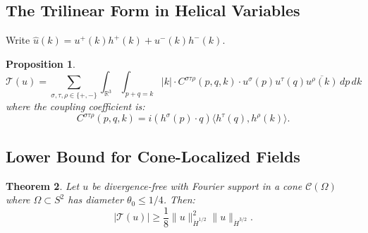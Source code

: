 \documentclass[11pt]{article}
\newtheorem{theorem}{Theorem}[section]
\newtheorem{proposition}[theorem]{Proposition}
\theoremstyle{definition}
\newcommand{\R}{\mathbb{R}}
\begin{document}
\subsection{The Trilinear Form in Helical Variables}

Write $\hat{u}(k) = u^+(k) h^+(k) + u^-(k) h^-(k)$.

\begin{proposition}\label{prop:trilinear-helical}
\begin{equation}
\mathcal{T}(u) = \sum_{\sigma, \tau, \rho \in \{+,-\}} \int_{\R^3} \int_{p+q=k} |k| \cdot C^{\sigma\tau\rho}(p,q,k) \cdot u^\sigma(p) u^\tau(q) \overline{u^\rho(k)} \, dp \, dk
\end{equation}
where the coupling coefficient is:
\begin{equation}
C^{\sigma\tau\rho}(p,q,k) = i(h^\sigma(p) \cdot q) \langle h^\tau(q), h^\rho(k) \rangle.
\end{equation}
\end{proposition}

\subsection{Lower Bound for Cone-Localized Fields}

\begin{theorem}\label{thm:trilinear-lower}
Let $u$ be divergence-free with Fourier support in a cone $\mathcal{C}(\Omega)$ where $\Omega \subset S^2$ has diameter $\theta_0 \leq 1/4$. Then:
\begin{equation}
|\mathcal{T}(u)| \geq \frac{1}{8} \|u\|_{\dot{H}^{1/2}}^2 \|u\|_{\dot{H}^{3/2}}.
\end{equation}
\end{theorem}
\end{document}
